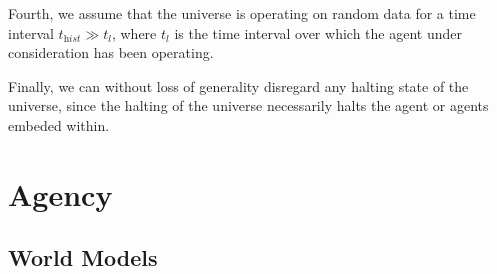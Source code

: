 \documentclass[12pt]{article}
\theoremstyle{definition}
\begin{document}




Fourth, we assume that the universe is operating on random data for a time
interval \(t_\textit{hist} \gg t_l\), where \(t_l\) is the time interval over
which the agent under consideration has been operating.

Finally, we can without loss of generality disregard any halting state of the
universe, since the halting of the universe necessarily halts the agent or
agents embeded within.


\section{Agency}
\label{sec:agents}


\subsection{World Models}
\label{sec:models}
\end{document}
